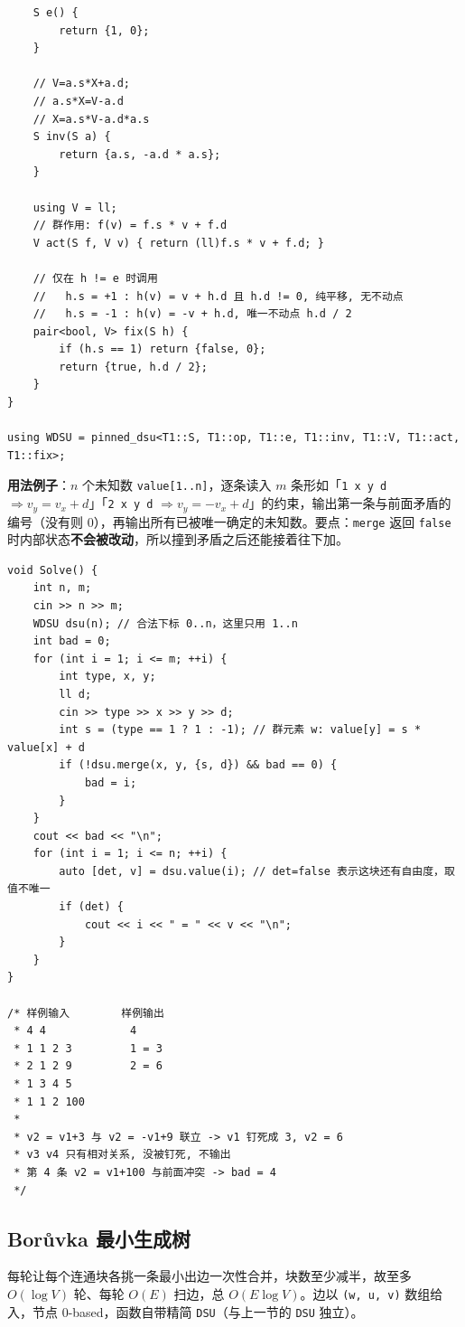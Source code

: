 \begin{multicols*}{2}
\begin{verbatim}
	S e() {
		return {1, 0};
	}

	// V=a.s*X+a.d;
	// a.s*X=V-a.d
	// X=a.s*V-a.d*a.s
	S inv(S a) {
		return {a.s, -a.d * a.s};
	}

	using V = ll;
	// 群作用: f(v) = f.s * v + f.d
	V act(S f, V v) { return (ll)f.s * v + f.d; }

	// 仅在 h != e 时调用
	//   h.s = +1 : h(v) = v + h.d 且 h.d != 0, 纯平移, 无不动点
	//   h.s = -1 : h(v) = -v + h.d, 唯一不动点 h.d / 2
	pair<bool, V> fix(S h) {
		if (h.s == 1) return {false, 0};
		return {true, h.d / 2};
	}
}

using WDSU = pinned_dsu<T1::S, T1::op, T1::e, T1::inv, T1::V, T1::act, T1::fix>;
		\end{verbatim}

		\textbf{用法例子}：$n$ 个未知数 \verb|value[1..n]|，逐条读入 $m$ 条形如「\verb|1 x y d| $\Rightarrow v_y = v_x + d$」「\verb|2 x y d| $\Rightarrow v_y = -v_x + d$」的约束，输出第一条与前面矛盾的编号（没有则 $0$），再输出所有已被唯一确定的未知数。要点：\verb|merge| 返回 \verb|false| 时内部状态\textbf{不会被改动}，所以撞到矛盾之后还能接着往下加。

		\begin{verbatim}
void Solve() {
	int n, m;
	cin >> n >> m;
	WDSU dsu(n); // 合法下标 0..n，这里只用 1..n
	int bad = 0;
	for (int i = 1; i <= m; ++i) {
		int type, x, y;
		ll d;
		cin >> type >> x >> y >> d;
		int s = (type == 1 ? 1 : -1); // 群元素 w: value[y] = s * value[x] + d
		if (!dsu.merge(x, y, {s, d}) && bad == 0) {
			bad = i;
		}
	}
	cout << bad << "\n";
	for (int i = 1; i <= n; ++i) {
		auto [det, v] = dsu.value(i); // det=false 表示这块还有自由度，取值不唯一
		if (det) {
			cout << i << " = " << v << "\n";
		}
	}
}

/* 样例输入        样例输出
 * 4 4             4
 * 1 1 2 3         1 = 3
 * 2 1 2 9         2 = 6
 * 1 3 4 5
 * 1 1 2 100
 *
 * v2 = v1+3 与 v2 = -v1+9 联立 -> v1 钉死成 3, v2 = 6
 * v3 v4 只有相对关系, 没被钉死, 不输出
 * 第 4 条 v2 = v1+100 与前面冲突 -> bad = 4
 */
		\end{verbatim}


		\subsection{Borůvka 最小生成树}

		每轮让每个连通块各挑一条最小出边一次性合并，块数至少减半，故至多 $O(\log V)$ 轮、每轮 $O(E)$ 扫边，总 $O(E\log V)$。边以 \texttt{(w, u, v)} 数组给入，节点 0-based，函数自带精简 \texttt{DSU}（与上一节的 \texttt{DSU} 独立）。


\end{multicols*}
